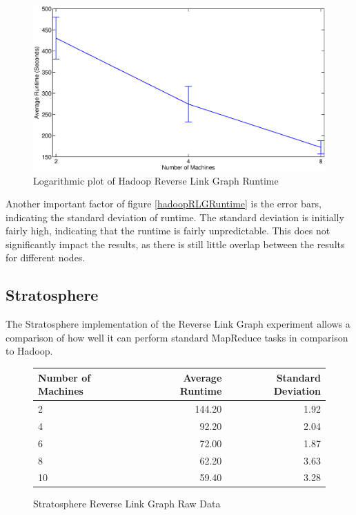 \begin{figure}[H]
	\centering
	\includegraphics[scale=0.6]{resources/HadoopRLGScalability.eps}
	\caption{Logarithmic plot of Hadoop Reverse Link Graph Runtime}
	\label{hadoopRLGScalability}
\end{figure}

Another important factor of figure \ref{hadoopRLGRuntime} is the error bars, indicating the standard deviation of runtime. The standard deviation is initially fairly high, indicating that the runtime is fairly unpredictable. This does not significantly impact the results, as there is still little overlap between the results for different nodes.

\subsection{Stratosphere}
The Stratosphere implementation of the Reverse Link Graph experiment allows a comparison of how well it can perform standard MapReduce tasks in comparison to Hadoop. 

\begin{figure}[H]
\centering
	\begin{tabular}{lrr}
		\toprule
		Number of Machines & Average Runtime & Standard Deviation \\
		\midrule

		2 & 144.20 & 1.92 \\
		4 & 92.20 & 2.04 \\
		6 & 72.00 & 1.87 \\
		8 & 62.20 & 3.63 \\
		10 & 59.40 & 3.28 \\
		\bottomrule
	\end{tabular}
	\caption{Stratosphere Reverse Link Graph Raw Data}
\end{figure}

